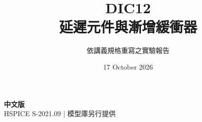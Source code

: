 \documentclass[11pt,a4paper]{article}
\title{\color{accent}DIC12\\[4pt]延遲元件與漸增緩衝器}
\author{依講義規格重寫之實驗報告}
\date{17 October 2026}
\begin{document}
\maketitle
\begin{center}\small\textbf{中文版}\\
HSPICE S-2021.09 \quad | \quad 模型庫另行提供
\end{center}


\end{document}
